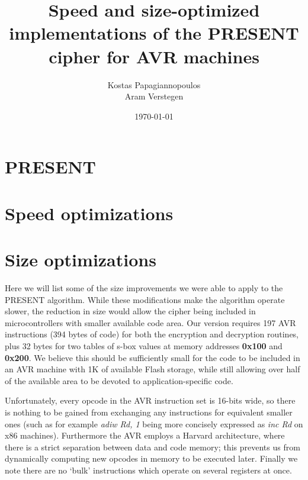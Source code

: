 \documentclass{llncs}
\begin{document}
\title{Speed and size-optimized implementations of the PRESENT cipher for AVR machines}
\author{
Kostas Papagiannopoulos \\
Aram Verstegen
}
\date{\today}

\maketitle


\section{PRESENT}
\cite{bogdanov2007present}
\section{Speed optimizations}
\cite{gong2009towards}
\section{Size optimizations}

Here we will list some of the size improvements we were able to apply to the PRESENT algorithm.
While these modifications make the algorithm operate slower, the reduction in size would allow the cipher being included in microcontrollers with smaller available code area.
Our version requires 197 AVR instructions (394 bytes of code) for both the encryption and decryption routines, plus 32 bytes for two tables of s-box values at memory addresses \textbf{0x100} and \textbf{0x200}.
We believe this should be sufficiently small for the code to be included in an AVR machine with 1K of available Flash storage, while still allowing over half of the available area to be devoted to application-specific code.

Unfortunately, every opcode in the AVR instruction set is 16-bits wide, so there is nothing to be gained from exchanging any instructions for equivalent smaller ones (such as for example \textit{adiw Rd, 1} being more concisely expressed as \textit{inc Rd} on x86 machines).
Furthermore the AVR employs a Harvard architecture, where there is a strict separation between data and code memory; this prevents us from dynamically computing new opcodes in memory to be executed later.
Finally we note there are no `bulk' instructions which operate on several registers at once.
\end{document}
